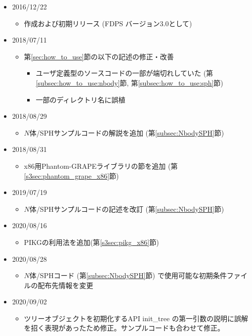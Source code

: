 \begin{itemize}
\item 2016/12/22
  \begin{itemize}
  \item 作成および初期リリース (FDPS バージョン3.0として)
  \end{itemize}
\item 2018/07/11
  \begin{itemize}
  \item 第\ref{sec:how_to_use}節の以下の記述の修正・改善
    \begin{itemize}
    \item ユーザ定義型のソースコードの一部が端切れしていた (第\ref{subsec:how_to_use:nbody}節, 第\ref{subsec:how_to_use:sph}節)
    \item 一部のディレクトリ名に誤植
    \end{itemize}
  \end{itemize}
\item 2018/08/29
  \begin{itemize}
  \item $N$体/SPHサンプルコードの解説を追加 (第\ref{subsec:NbodySPH}節)
  \end{itemize}
\item 2018/08/31
  \begin{itemize}
  \item x86用Phantom-GRAPEライブラリの節を追加 (第\ref{s3sec:phantom_grape_x86}節)
  \end{itemize}
\item 2019/07/19
  \begin{itemize}
  \item $N$体/SPHサンプルコードの記述を改訂 (第\ref{subsec:NbodySPH}節)
  \end{itemize}

\item 2020/08/16
  \begin{itemize}
  \item PIKGの利用法を追加(第\ref{s3sec:pikg_x86}節)
  \end{itemize}

\item 2020/08/28
  \begin{itemize}
  \item $N$体/SPHコード (第\ref{subsec:NbodySPH}節) で使用可能な初期条件ファイルの配布先情報を変更
  \end{itemize}

\item 2020/09/02
  \begin{itemize}
  \item ツリーオブジェクトを初期化するAPI init\_tree の第一引数の説明に誤解を招く表現があったため修正。サンプルコードも合わせて修正。
  \end{itemize}


\end{itemize}

